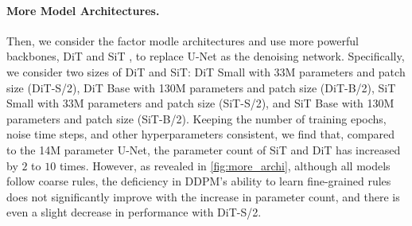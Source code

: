 \paragraph{More Model Architectures.}
Then, we consider the factor modle architectures and use more powerful backbones, DiT \cite{peebles2023scalable} and SiT \cite{ma2024sit}, to replace U-Net as the denoising network. Specifically, we consider two sizes of DiT and SiT: DiT Small with 33M parameters and patch size (DiT-S/2), DiT Base with 130M parameters and patch size (DiT-B/2), SiT Small with 33M parameters and patch size (SiT-S/2), and SiT Base with 130M parameters and patch size (SiT-B/2). Keeping the number of training epochs, noise time steps, and other hyperparameters consistent, we find that, compared to the 14M parameter U-Net, the parameter count of SiT and DiT has increased by $2$ to $10$ times. However, as revealed in \cref{fig:more_archi}, although all models follow coarse rules, the deficiency in DDPM's ability to learn fine-grained rules does not significantly improve with the increase in parameter count, and there is even a slight decrease in performance with DiT-S/2.
\begin{figure*}[]
\centering
    \hfill
    \hfill
    \hfill
    \hfill
    \hfill
\vspace{-0.1in}
\caption{\textbf{DDPM's capability in learning fine-grained rules with more powerful backbones.} Even with larger and more advanced denoising networks, DDPM still cannot avoid generating samples that violate fine-grained rules. This indicates that DDPM's inability to learn fine-grained rules is decoupled from model architecture. The visualized generated samples fall within the  interval $[2.5\%, 97.5\%]$.}
\vspace{-0.15in}
\label{fig:more_archi}
\end{figure*}

